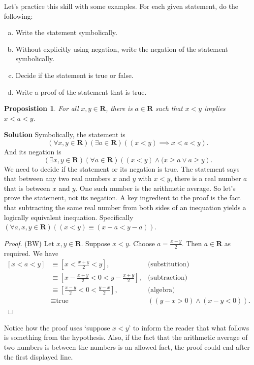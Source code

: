 \documentclass[12pt,fleqn,answers]{exam}
\newcommand{\reals}{\mathbf{R}}
\newenvironment{myproof}
  {\begin{shaded}\begin{proof}}
  {\end{proof}\end{shaded}}
\newtheorem{prop}{Proposistion}
\newenvironment{alphalist}{
  \begin{enumerate}[(a)]
    \addtolength{\itemsep}{-0.50\itemsep}}
  {\end{enumerate}}
\begin{document}
Let's practice this skill with some examples. For each given
statement, do the following: 
\begin{alphalist}
\item Write the statement symbolically.
\item Without explicitly using negation, write the negation of 
    the statement symbolically.
\item Decide if the statement is true or false.
\item  Write a proof of the statement that is true.
\end{alphalist}


\begin{prop}
  For all $x,y \in \reals$, there is $a \in \reals$ such that
    $x < y$ implies $x<a<y$.    
\end{prop}

\noindent \textbf{Solution} Symbolically, the statement is 
    \begin{equation*}
      \left(\forall x,y \in \reals\right)
      \left(\exists a \in \reals \right)
      \left ((x< y) \implies x < a < y\right).
    \end{equation*}
    And its negation is 
     \begin{equation*}
      \left(\exists x,y \in \reals\right)
      \left(\forall a \in \reals \right)
      \left ((x< y) \land (x \geq a \lor a \geq y \right).
    \end{equation*}
    We need to decide if the statement or its negation is true. The statement says that between any two real 
    numbers $x$ and $y$ with $x < y$, there is  a real number $a$ that is between $x$ and $y$. One such number is the arithmetic average. So   let's prove the statement, not its negation.
     A key ingredient to the proof is the fact that subtracting
     the same real number from both sides of an inequation yields 
     a logically equivalent inequation. Specifically  
     $(\forall a,x,y \in \reals)( (x< y) \equiv (x-a < y-a))$.   
    \begin{myproof} (BW)
     Let $x,y \in \reals$. Suppose $x < y$. Choose $a = \frac{x+y}{2}$.
     Then $a \in \reals$ as required. We have
     \begin{align*}
       \left[ x < a < y \right] 
           &\equiv \left[ x < \frac{x+y}{2} < y \right], &\mbox{(substitution)} \\
           & \equiv \left[ x - \frac{x+y}{2} < 0 < y - \frac{x+y}{2}  \right], &\mbox{(subtraction)} \\
           & \equiv \left[ \frac{x-y}{2} < 0 < \frac{y-x}{2}  \right], &\mbox{(algebra)} \\
           & \equiv \mbox{true} &((y-x > 0) \land (x-y < 0)).
     \end{align*} 
        \end{myproof}
      \noindent Notice how the proof uses `suppose $x < y$' to 
      inform the reader that what follows is something from the hypothesis.
      Also, if the fact that the arithmetic average of two numbers is between the numbers is an allowed fact, the proof
     could end after the first displayed line.
\end{document}
